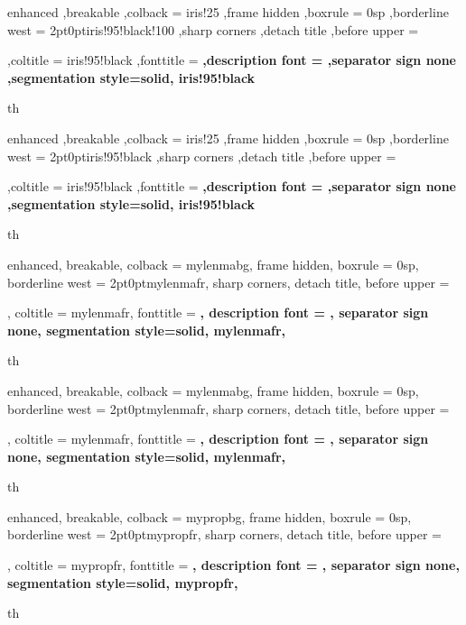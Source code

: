{%
	enhanced
	,breakable
	,colback = iris!25
	,frame hidden
	,boxrule = 0sp
	,borderline west = {2pt}{0pt}{iris!95!black!100}
	,sharp corners
	,detach title
	,before upper = \tcbtitle\par\smallskip
	,coltitle = iris!95!black
	,fonttitle = \bfseries\sffamily
	,description font = \mdseries
	,separator sign none
	,segmentation style={solid, iris!95!black}
}
{th}
{%
	enhanced
	,breakable
	,colback = iris!25
	,frame hidden
	,boxrule = 0sp
	,borderline west = {2pt}{0pt}{iris!95!black}
	,sharp corners
	,detach title
	,before upper = \tcbtitle\par\smallskip
	,coltitle = iris!95!black
	,fonttitle = \bfseries\sffamily
	,description font = \mdseries
	,separator sign none
	,segmentation style={solid, iris!95!black}
}
{th}


{%
	enhanced,
	breakable,
	colback = mylenmabg,
	frame hidden,
	boxrule = 0sp,
	borderline west = {2pt}{0pt}{mylenmafr},
	sharp corners,
	detach title,
	before upper = \tcbtitle\par\smallskip,
	coltitle = mylenmafr,
	fonttitle = \bfseries\sffamily,
	description font = \mdseries,
	separator sign none,
	segmentation style={solid, mylenmafr},
}
{th}
{%
	enhanced,
	breakable,
	colback = mylenmabg,
	frame hidden,
	boxrule = 0sp,
	borderline west = {2pt}{0pt}{mylenmafr},
	sharp corners,
	detach title,
	before upper = \tcbtitle\par\smallskip,
	coltitle = mylenmafr,
	fonttitle = \bfseries\sffamily,
	description font = \mdseries,
	separator sign none,
	segmentation style={solid, mylenmafr},
}
{th}



{%
	enhanced,
	breakable,
	colback = mypropbg,
	frame hidden,
	boxrule = 0sp,
	borderline west = {2pt}{0pt}{mypropfr},
	sharp corners,
	detach title,
	before upper = \tcbtitle\par\smallskip,
	coltitle = mypropfr,
	fonttitle = \bfseries\sffamily,
	description font = \mdseries,
	separator sign none,
	segmentation style={solid, mypropfr},
}
{th}

